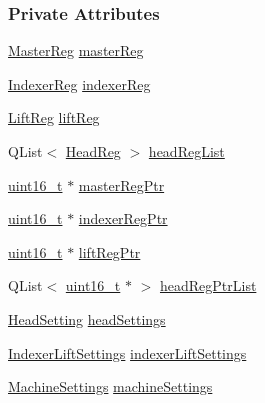 \subsubsection*{Private Attributes}
\begin{DoxyCompactItemize}
\item 
\mbox{\hyperlink{classRegister_a630b191556a3f41212c05692cde34bb6}{Master\+Reg}} \mbox{\hyperlink{classRegister_ae778c3bcd7170fe6648df3979082e9f8}{master\+Reg}}
\item 
\mbox{\hyperlink{classRegister_ae3e4e798be262566081377b4a056b86f}{Indexer\+Reg}} \mbox{\hyperlink{classRegister_ae56b5e4f7096735ffadf834c1ba32dff}{indexer\+Reg}}
\item 
\mbox{\hyperlink{classRegister_a565ad47577d69936817417bdb0a3369f}{Lift\+Reg}} \mbox{\hyperlink{classRegister_a5287cbe2ef32fdb9cdbcd6e4bdd82647}{lift\+Reg}}
\item 
Q\+List$<$ \mbox{\hyperlink{classRegister_aedd78617c89acc840bea50ffba355f24}{Head\+Reg}} $>$ \mbox{\hyperlink{classRegister_ab9927aff93ca16b97cae90d810047625}{head\+Reg\+List}}
\item 
\mbox{\hyperlink{settings_8h_a017dd44e68049ffdd31500a8cd01ba68}{uint16\+\_\+t}} $\ast$ \mbox{\hyperlink{classRegister_a57e680b6239c2b14a00b80bfab9fae77}{master\+Reg\+Ptr}}
\item 
\mbox{\hyperlink{settings_8h_a017dd44e68049ffdd31500a8cd01ba68}{uint16\+\_\+t}} $\ast$ \mbox{\hyperlink{classRegister_a6eec5512adfc9fb838b852de83eec936}{indexer\+Reg\+Ptr}}
\item 
\mbox{\hyperlink{settings_8h_a017dd44e68049ffdd31500a8cd01ba68}{uint16\+\_\+t}} $\ast$ \mbox{\hyperlink{classRegister_a3ffd2d5dcaad7556d2294695f3aa1b13}{lift\+Reg\+Ptr}}
\item 
Q\+List$<$ \mbox{\hyperlink{settings_8h_a017dd44e68049ffdd31500a8cd01ba68}{uint16\+\_\+t}} $\ast$ $>$ \mbox{\hyperlink{classRegister_a380d6cf2ae7d1daf2233d1f3a4071426}{head\+Reg\+Ptr\+List}}
\item 
\mbox{\hyperlink{classHeadSetting}{Head\+Setting}} \mbox{\hyperlink{classRegister_abe6be3eb1c03846b4bc9d8b592e95aa2}{head\+Settings}}
\item 
\mbox{\hyperlink{classIndexerLiftSettings}{Indexer\+Lift\+Settings}} \mbox{\hyperlink{classRegister_a626e3a840f876d2c9dcd06a090206120}{indexer\+Lift\+Settings}}
\item 
\mbox{\hyperlink{classMachineSettings}{Machine\+Settings}} \mbox{\hyperlink{classRegister_a699160d390150434cc4c0201fd9d2f12}{machine\+Settings}}
\end{DoxyCompactItemize}


